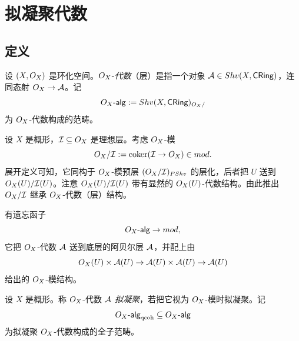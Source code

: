 
\section{拟凝聚代数}\label{sec:14}

\subsection{定义}\label{sec:14.1}

\begin{definition}\label{def:14.1.1}
设 $(X,O_X)$ 是环化空间。$O_X$-\emph{代数}（层）是指一个对象 $\mathcal{A}\in Shv(X,\mathsf{CRing})$，连同态射 $O_X\to\mathcal{A}$。记
\[
O_X\text{-}\mathsf{alg}:=Shv(X,\mathsf{CRing})_{O_X/}
\]
为 $O_X$-代数构成的范畴。
\end{definition}

\begin{construction}\label{con:14.1.2}
设 $X$ 是概形，$\mathcal{I}\subseteq O_X$ 是理想层。考虑 $O_X$-模
\[
O_X/\mathcal{I}:=\operatorname{coker}(\mathcal{I}\to O_X)\in mod.
\]
展开定义可知，它同构于 $O_X$-模预层 $(O_X/\mathcal{I})_{PShv}$ 的层化，后者把 $U$ 送到 $O_X(U)/\mathcal{I}(U)$。注意 $O_X(U)/\mathcal{I}(U)$ 带有显然的 $O_X(U)$-代数结构。由此推出 $O_X/\mathcal{I}$ 继承 $O_X$-代数（层）结构。
\end{construction}

\begin{construction}\label{con:14.1.3}
有遗忘函子
\[
O_X\text{-}\mathsf{alg}\to mod,
\]
它把 $O_X$-代数 $\mathcal{A}$ 送到底层的阿贝尔层 $\mathcal{A}$，并配上由
\[
O_X(U)\times\mathcal{A}(U)\to\mathcal{A}(U)\times\mathcal{A}(U)\to\mathcal{A}(U)
\]
给出的 $O_X$-模结构。
\end{construction}

\begin{definition}\label{def:14.1.4}
设 $X$ 是概形。称 $O_X$-代数 $\mathcal{A}$ \emph{拟凝聚}，若把它视为 $O_X$-模时拟凝聚。记
\[
O_X\text{-}\mathsf{alg}_{\mathrm{qcoh}}\subseteq O_X\text{-}\mathsf{alg}
\]
为拟凝聚 $O_X$-代数构成的全子范畴。
\end{definition}

